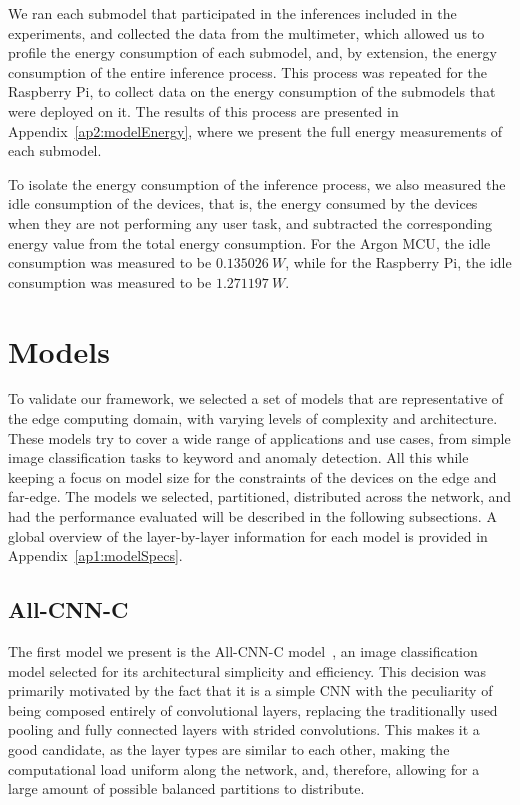 We ran each submodel that participated in the
inferences included in the experiments, and collected the data from the multimeter, 
which allowed us to profile the energy consumption of each submodel, and, by extension, 
the energy consumption of the entire inference process. This process was repeated
for the Raspberry Pi, to collect data on the energy consumption of the submodels that
were deployed on it. The results of this process are presented in Appendix~\ref{ap2:modelEnergy}, 
where we present the full energy measurements of each submodel.

To isolate the energy consumption of the inference process, we also measured the idle
consumption of the devices, that is, the energy consumed by the devices when they are
not performing any user task, and subtracted the corresponding energy value from the
total energy consumption. For the Argon \ac{MCU}, the idle consumption was measured to
be $0.135026~W$, while for the Raspberry Pi, the idle consumption was measured to be 
$1.271197~W$. 


\section {Models} \label{sec:se52}

To validate our framework, we selected a set of models that are representative of the
edge computing domain, with varying levels of complexity and architecture. These models
try to cover a wide range of applications and use cases, from simple image classification
tasks to keyword and anomaly detection. All this while keeping a focus on
model size for the constraints of the devices on the edge and far-edge. The models we
selected, partitioned, distributed across the network, and had the performance evaluated
will be described in the following subsections. A global overview of the layer-by-layer
information for each model is provided in Appendix~\ref{ap1:modelSpecs}.

\subsection {All-CNN-C} \label{sec:se521}

The first model we present is the All-CNN-C model~\cite{all-cnn-c-springenberg2015},
an image classification model selected for its architectural simplicity and efficiency.
This decision was primarily motivated by the fact that it is a simple \ac{CNN} with
the peculiarity of being composed entirely of convolutional layers, replacing the
traditionally used pooling and fully connected layers with strided convolutions. 
This makes it a good candidate, as the layer types are similar to each other, making 
the computational load uniform along the network, and, therefore, allowing for
a large amount of possible balanced partitions to distribute.

